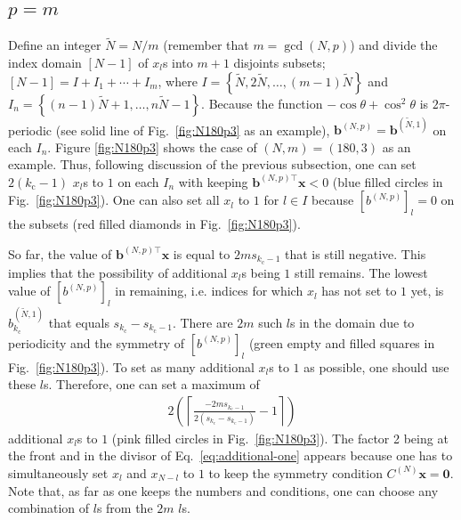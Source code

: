 \subsection{$p=m$}
\label{subsec:p_m}
Define an integer $\widetilde{N}=N/m$ (remember that $m=\gcd(N,p)$) and divide the index domain $[N-1]$ of $x_l$s into $m+1$ disjoints subsets; $[N-1]=I+I_1+\cdots +I_m$, where $I=\left\{\widetilde{N}, 2\widetilde{N},\dots, (m-1)\widetilde{N}\right\}$ and $I_n=\left\{(n-1)\widetilde{N}+1,\dots ,n\widetilde{N}-1\right\}$. Because the function $-\cos\theta+\cos^{2}\theta$ is $2\pi$-periodic (see solid line of Fig.~\ref{fig:N180p3} as an example), $\bm{b}^{(N,p)}=\bm{b}^{(\widetilde{N},1)}$ on each $I_{n}$. Figure \ref{fig:N180p3} shows the case of $(N,m)= (180,3) $ as an example. Thus, following discussion of the previous subsection, one can set $2(k_{\mathrm{c}}-1)$ $x_l$s to $1$ on each $I_n$ with keeping $\bm{b}^{(N,p) \top}\bm{x}<0$ (blue filled circles in Fig.~\ref{fig:N180p3}). One can also set all $x_l$ to $1$ for $l\in I$ because $\left[b^{(N,p)}\right]_{l}=0$ on the subsets (red filled diamonds in Fig.~\ref{fig:N180p3}).

So far, the value of $\bm{b}^{(N,p) \top}\bm{x}$ is equal to $2ms_{k_{\mathrm{c}}-1}$ that is still negative. This implies that the possibility of additional $x_l$s being $1$ still remains. The lowest value of $\left[b^{(N,p)}\right]_{l}$ in remaining, i.e. indices for which $x_l$ has not set to $1$ yet, is $b^{(\widetilde{N},1)}_{k_{\mathrm{c}}}$ that equals $s_{k_{\mathrm{c}}}-s_{k_{\mathrm{c}}-1}$. There are $2m$ such $l$s in the domain due to periodicity and the symmetry of $\left[b^{(N,p)}\right]_{l}$ (green empty and filled squares in Fig.~\ref{fig:N180p3}). To set as many additional $x_l$s to $1$ as possible, one should use these $l$s. Therefore, one can set a maximum of
\begin{align}
    2\left(\left\lceil\frac{-2ms_{k_{\mathrm{c}}-1}}{2(s_{k_{\mathrm{c}}}-s_{k_{\mathrm{c}}-1})}-1\right\rceil\right)
    \label{eq:additional-one}
\end{align}
additional $x_l$s to $1$ (pink filled circles in Fig.~\ref{fig:N180p3}). The factor 2 being at the front and in the divisor of Eq.~\eqref{eq:additional-one} appears because one has to simultaneously set $x_l$ and $x_{N-l}$ to $1$ to keep the symmetry condition $C^{(N)}\bm{x}=\bm{0}$. Note that, as far as one keeps the numbers and conditions, one can choose any combination of $l$s from the $2m$ $l$s.


